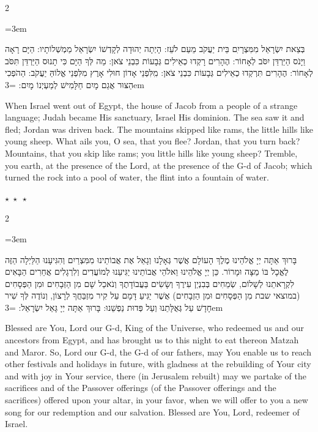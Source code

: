 \documentclass[11pt, openany]{book}
\newenvironment{bilingual}{%
  \par\vspace{4pt}%
  \begin{paracol}{2}%
}{%
  \end{paracol}%
  \par\vspace{2pt}%
}
\newenvironment{hebrewcol}{%
  \switchcolumn[1]%
  \begingroup
  \RTL
  \hebrewfont\large
  \setstretch{1.4}%
  \emergencystretch=3em
  \tolerance=9999
  \parindent=0pt\relax
}{%
  \endRTL
  \endgroup
}
\newenvironment{englishcol}{%
  \switchcolumn[0]%
  \begingroup
  \setstretch{1.4}%
  \emergencystretch=3em
  \tolerance=9999
  \normalsize
  \rightskip=0.12in\relax
}{%
  \endgroup
}
\newcommand{\parasep}{%
  \par\vspace{3pt}
  \begin{center}
    \textcolor{sedergold!50}{\small$\star\;\star\;\star$}
  \end{center}
  \par\vspace{3pt}
}
\begin{document}
\begin{bilingual}
\begin{hebrewcol}
בְּצֵאת יִשְׂרָאֵל מִמִּצְרָיִִם בֵּית יַעֲקֹב מֵעַם לֹעֵז: הָיְתָה יְהוּדָה לְקָדְשׁוֹ יִשְׂרָאֵל מַמְשְׁלוֹתָיו: הַיָּם רָאָה וַיָּנֹס הַיַּרְדֵּן יִסֹּב לְאָחוֹר: הֶהָרִים רָקְדוּ כְאֵילִים גְּבָעוֹת כִּבְנֵי צֹאן: מַה לְּךָ הַיָּם כִּי תָנוּס הַיַּרְדֵּן תִּסֹּב לְאָחוֹר: הֶהָרִים תִּרְקְדוּ כְאֵילִים גְּבָעוֹת כִּבְנֵי צֹאן: מִִלִּפְנֵי אָדוֹן חוּלִי אָרֶץ מִלִּפְנֵי אֱלוֹהַּ יַעֲקֹב: הַהֹפְכִי הַצּוּר אֲגַם מָיִם חַלָּמִישׁ לְמַעְיְנוֹ מָיִם:
\end{hebrewcol}
\begin{englishcol}
When Israel went out of Egypt, the house of Jacob from a people of a strange language; Judah became His sanctuary, Israel His dominion. The sea saw it and fled; Jordan was driven back. The mountains skipped like rams, the little hills like young sheep. What ails you, O sea, that you flee? Jordan, that you turn back? Mountains, that you skip like rams; you little hills like young sheep? Tremble, you earth, at the presence of the Lord, at the presence of the G-d of Jacob; which turned the rock into a pool of water, the flint into a fountain of water.
\end{englishcol}
\end{bilingual}
\parasep

\begin{bilingual}
\begin{hebrewcol}
בָּרוּךְ אַתָּה יְיָ אֱלֹהֵינוּ מֶלֶךְ הָעוֹלָם אֲשֶׁר גְּאָלָנוּ וְגָאַל אֶת אֲבוֹתֵינוּ מִמִּצְרַיִם וְהִגִּיעָנוּ הַלַּיְלָה הַזֶּה לֶאֱכָל בּוֹ מַצָּה וּמָרוֹר. כֵּן יְיָ אֱלֹהֵינוּ וֵאלֹהֵי אֲבוֹתֵינוּ יַגִּיעֵנוּ לְמוֹעֲדִים וְלִרְגָלִים אֲחֵרִים הַבָּאִים לִקְרָאתֵנוּ לְשָׁלוֹם, שְׂמֵחִים בְּבִנְיַן עִירֶךָ וְשָׂשִׂים בַּעֲבוֹדָתֶךָ וְנֹאכַל שָׁם מִן הַזְּבָחִים וּמִן הַפְּסָחִים (במוצאי שבת מִן הַפְּסָחִים וּמִן הַזְבָחִים) אֲשֶׁר יַגִּיעַ דָּמָם עַל קִיר מִזְבַּחֲךָ לְרָצוֹן, וְנוֹדֶה לְּךָ שִׁיר חָדָשׁ עַל גְּאֻלָּתֵנוּ וְעַל פְּדוּת נַפְשֵׁנוּ: בָּרוּךְ אַתָּה יְיָ גָּאַל יִשְׂרָאֵל:
\end{hebrewcol}
\begin{englishcol}
Blessed are You, Lord our G-d, King of the Universe, who redeemed us and our ancestors from Egypt, and has brought us to this night to eat thereon Matzah and Maror. So, Lord our G-d, the G-d of our fathers, may You enable us to reach other festivals and holidays in future, with gladness at the rebuilding of Your city and with joy in Your service, there (in Jerusalem rebuilt) may we partake of the sacrifices and of the Passover offerings (of the Passover offerings and the sacrifices) offered upon your altar, in your favor, when we will offer to you a new song for our redemption and our salvation. Blessed are You, Lord, redeemer of Israel.
\end{englishcol}
\end{bilingual}
\end{document}
